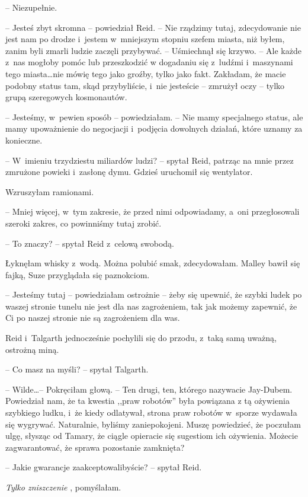 \documentclass[oneside,polish,11pt,sfheadings]{mwbk}
\begin{document}
-- Niezupełnie.

-- Jesteś zbyt skromna -- powiedział Reid. -- Nie rządzimy tutaj,
zdecydowanie nie jest nam po drodze i~jestem w~mniejszym stopniu szefem
miasta, niż byłem, zanim byli zmarli ludzie zaczęli przybywać. -- Uśmiechnął się krzywo. -- Ale każde z~nas mogłoby pomóc lub przeszkodzić
w dogadaniu się z~ludźmi i~maszynami tego miasta\ldots  nie mówię tego jako
groźby, tylko jako fakt. Zakładam, że macie podobny status tam, skąd
przybyliście, i~nie jesteście -- zmrużył oczy -- tylko grupą szeregowych
kosmonautów.

-- Jesteśmy, w~pewien sposób -- powiedziałam. -- Nie mamy specjalnego
status, ale mamy upoważnienie do negocjacji i~podjęcia dowolnych
działań, które uznamy za konieczne.

-- W~imieniu trzydziestu miliardów ludzi? -- spytał Reid, patrząc na mnie
przez zmrużone powieki i~zasłonę dymu. Gdzieś uruchomił się wentylator.

Wzruszyłam ramionami. 

-- Mniej więcej, w~tym zakresie, że przed nimi
odpowiadamy, a~oni przegłosowali szeroki zakres, co powinniśmy tutaj
zrobić.

-- To znaczy? -- spytał Reid z~celową swobodą.

Łyknęłam whisky z~wodą. Można polubić smak, zdecydowałam. Malley bawił
się fajką, Suze przyglądała się paznokciom.

-- Jesteśmy tutaj -- powiedziałam ostrożnie -- żeby się upewnić, że szybki
ludek po waszej stronie tunelu nie jest dla nas zagrożeniem, tak jak
możemy zapewnić, że Ci po naszej stronie nie są zagrożeniem dla was.

Reid i~Talgarth jednocześnie pochylili się do przodu, z~taką samą
uważną, ostrożną miną.

-- Co masz na myśli? -- spytał Talgarth.

-- Wilde\ldots  -- Pokręciłam głową. -- Ten drugi, ten, którego nazywacie
Jay-Dubem. Powiedział nam, że ta kwestia ,,praw robotów'' była powiązana
z tą ożywienia szybkiego ludku, i~że kiedy odlatywał, strona praw
robotów w~sporze wydawała się wygrywać. Naturalnie, byliśmy
zaniepokojeni. Muszę powiedzieć, że poczułam ulgę, słysząc od Tamary, że
ciągle opieracie się sugestiom ich ożywienia. Możecie zagwarantować, że
sprawa pozostanie zamknięta?

-- Jakie gwarancje zaakceptowalibyście? -- spytał Reid.

\textit{Tylko zniszczenie }, pomyślałam. 
\end{document}
